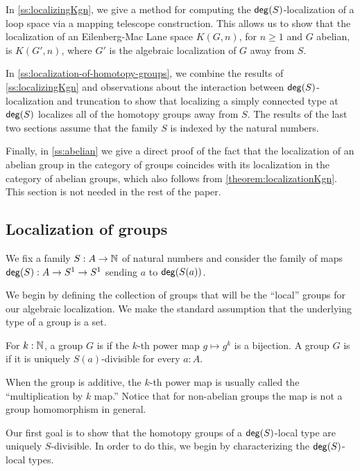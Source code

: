 In \cref{ss:localizingKgn}, we give a method for computing the $\mathsf{deg}(S)$-localization of a loop space via a mapping telescope construction. This allows us to show that the localization of an Eilenberg-Mac Lane space $K(G,n)$, for $n \geq 1$ and $G$ abelian, is $K(G',n)$, where $G'$ is the algebraic localization of $G$ away from $S$.

In \cref{ss:localization-of-homotopy-groups}, we combine the results of \cref{ss:localizingKgn} and observations about the interaction between $\mathsf{deg}(S)$-localization and truncation to show that localizing a simply connected type at $\mathsf{deg}(S)$ localizes all of the homotopy groups away from $S$.
The results of the last two sections assume that the family $S$ is indexed by the natural numbers.

Finally, in \cref{ss:abelian} we give a direct proof of the fact that
the localization of an abelian group in the category of groups coincides with
its localization in the category of abelian groups, which also follows from
\cref{theorem:localizationKgn}.
This section is not needed in the rest of the paper.

\subsection{Localization of groups}\label{ss:localizationofgroups}

We fix a family $S : A \to \mathbb{N}$ of natural numbers and consider the family
of maps $\mathsf{deg}(S) : A \to S^1 \to S^1$ sending $a$ to $\mathsf{deg}(S(a))$.

We begin by defining the collection of groups that will be the
``local'' groups for our algebraic localization.
We make the standard assumption that the underlying type of a group is a set.

\begin{defn}
    For $k : \mathbb{N}$, a group $G$ is  if the $k$-th power map
    $g \mapsto g^k$ is a bijection.
    A group $G$ is  if it is uniquely $S(a)$-divisible for every $a : A$.
\end{defn}

When the group is additive, the $k$-th power map is usually called the ``multiplication by $k$ map.''
Notice that for non-abelian groups the map is not a group homomorphism in general.

Our first goal is to show that the homotopy groups of a $\mathsf{deg}(S)$-local type
are uniquely $S$-divisible.
In order to do this, we begin by characterizing the $\mathsf{deg}(S)$-local types.


